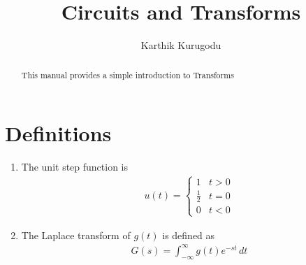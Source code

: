 \documentclass[journal,12pt,twocolumn]{IEEEtran}
\renewcommand\thesection{\arabic{section}}
\begin{document}
\makeatletter
{}
\makeatother
\let\StandardTheFigure\thefigure
\renewcommand{\thefigure}{\theproblem}
\def\putbox#1#2#3{\makebox[0in][l]{\makebox[#1][l]{}\raisebox{\baselineskip}[0in][0in]{\raisebox{#2}[0in][0in]{#3}}}}
\def\rightbox#1{\makebox[0in][r]{#1}}
\def\centbox#1{\makebox[0in]{#1}}
\def\topbox#1{\raisebox{-\baselineskip}[0in][0in]{#1}}
\def\midbox#1{\raisebox{-0.5\baselineskip}[0in][0in]{#1}}
\vspace{3cm}
\title{
Circuits and Transforms
}

\author{ Karthik Kurugodu
}

\maketitle
\tableofcontents
\renewcommand{\thefigure}{\theenumi}
\renewcommand{\thetable}{\theenumi}
\bigskip
\begin{abstract}
This manual provides a simple introduction to Transforms
\end{abstract}
\section{Definitions}
\begin{enumerate}[label=\arabic*.,ref=\thesection.\theenumi]
\item The unit step function is
\begin{align}
u(t) =
\begin{cases}
1 & t > 0
\\
\frac{1}{2} & t = 0
\\
0 & t < 0
\end{cases}
\end{align}
\item The Laplace transform of $g(t)$ is defined as
\begin{align}
G(s) = \int_{-\infty}^{\infty} g(t) e^{-st}\, dt
\end{align}
\end{enumerate}
\end{document}
